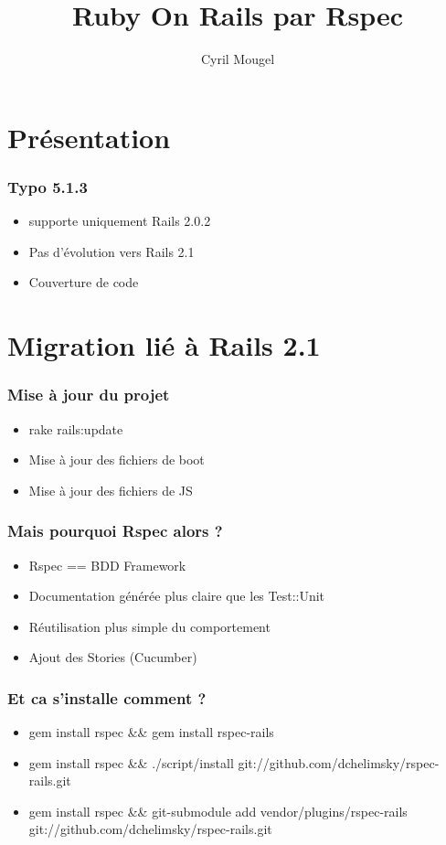 \documentclass{beamer}
\title{Ruby On Rails par Rspec}
\author{Cyril Mougel}
\begin{document}
\begin{frame}
    \titlepage
\end{frame}

\section{Présentation}

\begin{frame}
	\frametitle{Typo 5.1.3}
	\begin{itemize}
		\item supporte uniquement Rails 2.0.2
		\item Pas d'évolution vers Rails 2.1
		\item Couverture de code
	\end{itemize}
\end{frame}

\section{Migration lié à Rails 2.1}

\begin{frame}
    \frametitle{Mise à jour du projet}
    \begin{itemize}
        \item rake rails:update
        \item Mise à jour des fichiers de boot
        \item Mise à jour des fichiers de JS
    \end{itemize}
\end{frame}

\begin{frame}
    \frametitle{Mais pourquoi Rspec alors ?}
    \begin{itemize}
        \item Rspec == BDD Framework
        \item Documentation g\'en\'er\'ee plus claire que les Test::Unit
        \item R\'eutilisation plus simple du comportement
        \item Ajout des Stories (Cucumber)
    \end{itemize}
\end{frame}

\begin{frame}
    \frametitle{Et ca s'installe comment ?}
    \begin{itemize}
        \item gem install rspec \&\& gem install rspec-rails
        \item gem install rspec \&\& ./script/install git://github.com/dchelimsky/rspec-rails.git
        \item gem install rspec \&\& git-submodule add vendor/plugins/rspec-rails git://github.com/dchelimsky/rspec-rails.git
    \end{itemize}
\end{frame}
\end{document}
